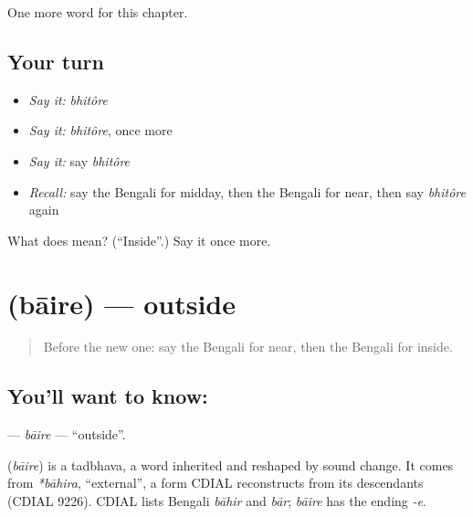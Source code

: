 \begin{grammarlens}[title={What you've built}]
One more word for this chapter.
\end{grammarlens}

\subsection*{Your turn}
\begin{itemize}
\raggedright
  \item \emph{Say it:} \emph{bhitôre}
  \item \emph{Say it:} \emph{bhitôre}, once more
  \item \emph{Say it:} say \emph{bhitôre}
  \item \emph{Recall:} say the Bengali for midday, then the Bengali for near, then say \emph{bhitôre} again
\end{itemize}

\begin{tcolorbox}[breakable,colback=teal!4,colframe=teal!35!black,title={Before you move on}]
What does  mean? (\textquotedblleft{}Inside\textquotedblright{}.) Say it once more.
\end{tcolorbox}
\section[\texorpdfstring{\bn{বাইরে} (bāire)}{বাইরে (bāire)}]{ (bāire) — outside}

\label{lesson:BN-C81-baire}



\begin{quote}
Before the new one: say the Bengali for near, then the Bengali for inside.
\end{quote}

\subsection*{You'll want to know: }
\textbf{} — \emph{bāire} — \textquotedblleft{}outside\textquotedblright{}.

\begin{cousinweb}
\textbf{} (\emph{bāire}) is a tadbhava, a word inherited and reshaped by sound change. It comes from \emph{*bāhira}, \textquotedblleft{}external\textquotedblright{}, a form CDIAL reconstructs from its descendants (CDIAL 9226). CDIAL lists Bengali \emph{bāhir} and \emph{bār}; \emph{bāire} has the ending \emph{-e}.
\end{cousinweb}

